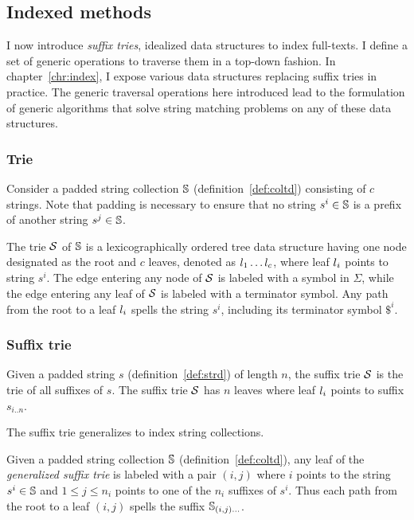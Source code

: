 \subsection{Indexed methods}
\label{sub:introindex}

I now introduce \emph{suffix tries}, idealized data structures to index full-texts.
I define a set of generic operations to traverse them in a top-down fashion.
In chapter~\ref{chr:index}, I expose various data structures replacing suffix tries in practice.
The generic traversal operations here introduced lead to the formulation of generic algorithms that solve string matching problems on any of these data structures.

\subsubsection{Trie}

Consider a padded string collection $\mathbb {S}$ (definition~\ref{def:coltd}) consisting of $c$ strings.
Note that padding is necessary to ensure that no string $s^i \in \mathbb {S}$ is a prefix of another string $s^j \in \mathbb {S}$.
\begin{definition}
The trie $\mathcal {S}$ of $\mathbb {S}$ is a lexicographically ordered tree data structure having one node designated as the root and $c$ leaves, denoted as $l_1 \dots l_c$, where leaf $l_i$ points to string $s^i$.
The edge entering any node of $\mathcal {S}$ is labeled with a symbol in $\Sigma$, while the edge entering any leaf of $\mathcal {S}$ is labeled with a terminator symbol.
Any path from the root to a leaf $l_i$ spells the string $s^i$, including its terminator symbol $\$^i$.
\end{definition}

\subsubsection{Suffix trie}

\begin{definition}
Given a padded string $s$ (definition~\ref{def:strd}) of length $n$, the suffix trie $\mathcal {S}$ is the trie of all suffixes of $s$.
The suffix trie $\mathcal {S}$ has $n$ leaves where leaf $l_i$ points to suffix $s_{i..n}$.
\end{definition}
The suffix trie generalizes to index string collections.
\begin{definition}
Given a padded string collection $\mathbb {S}$ (definition~\ref{def:coltd}), any leaf of the \emph{generalized suffix trie} is labeled with a pair $(i,j)$ where $i$ points to the string $s^i \in \mathbb {S}$ and $1 \leq j \leq n_i$ points to one of the $n_i$ suffixes of $s^i$.
Thus each path from the root to a leaf $(i,j)$ spells the suffix $\mathbb {S}_{(i,j) \dots}$.
\end{definition}

